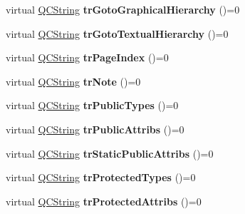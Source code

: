 \begin{DoxyCompactItemize}
\item 
\hypertarget{class_translator_a6603c284ec70bfeaea08ea86facb2d70}{virtual \hyperlink{class_q_c_string}{Q\-C\-String} {\bfseries tr\-Goto\-Graphical\-Hierarchy} ()=0}\label{class_translator_a6603c284ec70bfeaea08ea86facb2d70}

\item 
\hypertarget{class_translator_abbb7f3207ff306723af69a95ed8b0d78}{virtual \hyperlink{class_q_c_string}{Q\-C\-String} {\bfseries tr\-Goto\-Textual\-Hierarchy} ()=0}\label{class_translator_abbb7f3207ff306723af69a95ed8b0d78}

\item 
\hypertarget{class_translator_a7f13e3f6d67c69373b1daac334b23f12}{virtual \hyperlink{class_q_c_string}{Q\-C\-String} {\bfseries tr\-Page\-Index} ()=0}\label{class_translator_a7f13e3f6d67c69373b1daac334b23f12}

\item 
\hypertarget{class_translator_abf0b0b80df531f2e840bccdcd04397fd}{virtual \hyperlink{class_q_c_string}{Q\-C\-String} {\bfseries tr\-Note} ()=0}\label{class_translator_abf0b0b80df531f2e840bccdcd04397fd}

\item 
\hypertarget{class_translator_aa759630e7191ed1ef367bb90a2218984}{virtual \hyperlink{class_q_c_string}{Q\-C\-String} {\bfseries tr\-Public\-Types} ()=0}\label{class_translator_aa759630e7191ed1ef367bb90a2218984}

\item 
\hypertarget{class_translator_a12c13e35ffa56a7375f551bfbfaa54cb}{virtual \hyperlink{class_q_c_string}{Q\-C\-String} {\bfseries tr\-Public\-Attribs} ()=0}\label{class_translator_a12c13e35ffa56a7375f551bfbfaa54cb}

\item 
\hypertarget{class_translator_a39e0fb6154ed5e774563770c24e2d2bc}{virtual \hyperlink{class_q_c_string}{Q\-C\-String} {\bfseries tr\-Static\-Public\-Attribs} ()=0}\label{class_translator_a39e0fb6154ed5e774563770c24e2d2bc}

\item 
\hypertarget{class_translator_a15fea0e101787bed479a9247e47326a3}{virtual \hyperlink{class_q_c_string}{Q\-C\-String} {\bfseries tr\-Protected\-Types} ()=0}\label{class_translator_a15fea0e101787bed479a9247e47326a3}

\item 
\hypertarget{class_translator_a9c37e514b0234dee278f56b7bea1ffcf}{virtual \hyperlink{class_q_c_string}{Q\-C\-String} {\bfseries tr\-Protected\-Attribs} ()=0}\label{class_translator_a9c37e514b0234dee278f56b7bea1ffcf}


\end{DoxyCompactItemize}
